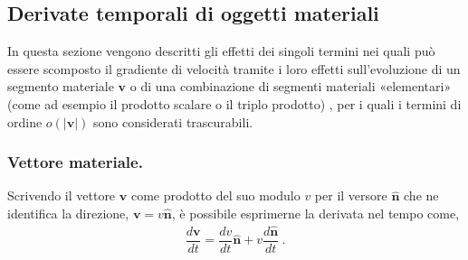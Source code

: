 \documentclass[letterpaper,10pt,italian]{jupyterBook}
\begin{document}
\subsection{Derivate temporali di oggetti materiali}
\label{\detokenize{polimi/fluidmechanics-ita/template/capitoli/03_cinematica/12teoria:derivate-temporali-di-oggetti-materiali}}
\sphinxAtStartPar
In questa sezione vengono descritti gli effetti dei singoli termini nei
quali può essere scomposto il gradiente di velocità tramite i loro
effetti sull’evoluzione di un segmento materiale \(\mathbf{v}\) o di una
combinazione di segmenti materiali «elementari» (come ad esempio il
prodotto scalare o il triplo prodotto) , per i quali i termini di ordine
\(o(|\mathbf{v}|)\) sono considerati trascurabili.


\subsubsection{Vettore materiale.}
\label{\detokenize{polimi/fluidmechanics-ita/template/capitoli/03_cinematica/12teoria:vettore-materiale}}
\sphinxAtStartPar
Scrivendo il vettore \(\mathbf{v}\) come prodotto del suo modulo \(v\) per il
versore \(\mathbf{\hat{n}}\) che ne identifica la direzione,
\(\mathbf{v} = v \mathbf{\hat{n}}\), è possibile esprimerne la derivata nel tempo
come,
\begin{equation*}
\begin{split}\label{eqn:cin:dvvec}
 \dfrac{d \mathbf{v}}{dt} = \dfrac{dv}{dt}\mathbf{\hat{n}} + v \dfrac{d \mathbf{\hat{n}}}{d t} \ .\end{split}
\end{equation*}
\end{document}
